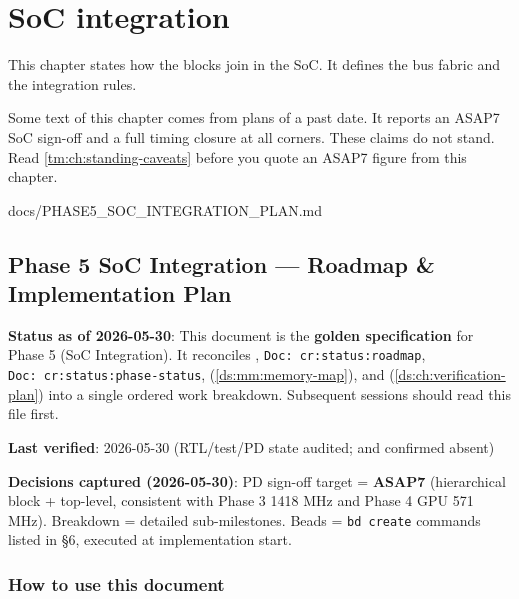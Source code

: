 \chapter{SoC integration}\label{ds:ch:soc-integration}

This chapter states how the blocks join in the SoC. It defines the bus fabric and the integration rules.

\begin{information}
Some text of this chapter comes from plans of a past date. It reports an ASAP7 SoC sign-off and a full timing closure at all corners. These claims do not stand. Read \cref{tm:ch:standing-caveats} before you quote an ASAP7 figure from this chapter.
\end{information}

\begin{relocated}{docs/PHASE5_SOC_INTEGRATION_PLAN.md}
\section{Phase 5 SoC Integration --- Roadmap \& Implementation Plan}\label{ds:ch:phase5-soc-integration-plan}

\textbf{Status as of 2026-05-30}: This document is the \textbf{golden
specification} for Phase 5 (SoC Integration). It reconciles
,
\texttt{Doc:\allowbreak{}\ cr:\allowbreak{}status:\allowbreak{}roadmap},
\texttt{Doc:\allowbreak{}\ cr:\allowbreak{}status:\allowbreak{}phase-\allowbreak{}status},
 (\cref{ds:mm:memory-map}), and
 (\cref{ds:ch:verification-plan}) into a single ordered work
breakdown. Subsequent sessions should read this file first.

\textbf{Last verified}: 2026-05-30
(RTL/\allowbreak{}test/\allowbreak{}PD state audited; 
and  confirmed absent)

\textbf{Decisions captured (2026-05-30)}: PD sign-off target =
\textbf{ASAP7} (hierarchical block + top-level, consistent with Phase 3
1418 MHz and Phase 4 GPU 571 MHz). Breakdown = detailed sub-milestones.
Beads = \texttt{bd\ create} commands listed in §6, executed at
implementation start.

\subsection{How to use this document}\label{ds:ch:phase5-soc-integration-plan:how-to-use-this-document}


\end{relocated}
